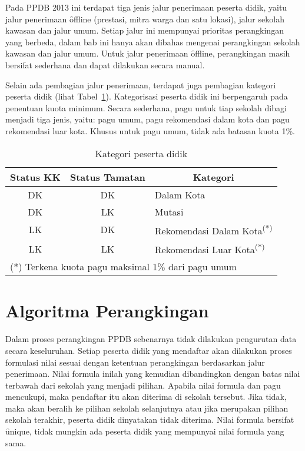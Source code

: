 Pada PPDB 2013 ini terdapat tiga jenis jalur penerimaan peserta didik, yaitu
jalur penerimaan \f{offline} (prestasi, mitra warga dan satu lokasi), jalur
sekolah kawasan dan jalur umum. Setiap jalur ini mempunyai prioritas
perangkingan yang berbeda, dalam bab ini hanya akan dibahas mengenai
perangkingan sekolah kawasan dan jalur umum. Untuk jalur penerimaan
\f{offline}, perangkingan masih bersifat sederhana dan dapat dilakukan secara
manual.

Selain ada pembagian jalur penerimaan, terdapat juga pembagian kategori peserta
didik (lihat Tabel~\ref{tab:kategori}). Kategorisasi peserta didik ini
berpengaruh pada penentuan kuota minimum.  Secara sederhana, pagu untuk tiap
sekolah dibagi menjadi tiga jenis, yaitu: pagu umum, pagu rekomendasi dalam
kota dan pagu rekomendasi luar kota. Khusus untuk pagu umum, tidak ada batasan
kuota 1\%.

\begin{table}
\centering 
\caption{Kategori peserta didik}
\label{tab:kategori}
\begin{tabular} {c c l}
  \hline
  Status KK & Status Tamatan & \multicolumn{1}{c}{Kategori} \\
  \hline
  \hline
  DK & DK & Dalam Kota \\
  DK & LK & Mutasi \\
  LK & DK & Rekomendasi Dalam Kota\textsuperscript{(*)} \\
  LK & LK & Rekomendasi Luar Kota\textsuperscript{(*)} \\
  \hline  
  \multicolumn{3}{l}{\footnotesize{(*) Terkena kuota pagu maksimal 1\% dari pagu umum}} \\
\end{tabular}
\end{table}


\section{Algoritma Perangkingan}
\label{sec:algoritma_perangkingan}

Dalam proses perangkingan PPDB sebenarnya tidak dilakukan pengurutan data
secara keseluruhan. Setiap peserta didik yang mendaftar akan dilakukan proses
formulasi nilai sesuai dengan ketentuan perangkingan berdasarkan jalur
penerimaan. Nilai formula inilah yang kemudian dibandingkan dengan batas nilai
terbawah dari sekolah yang menjadi pilihan. Apabila nilai formula dan pagu
mencukupi, maka pendaftar itu akan diterima di sekolah tersebut. Jika tidak,
maka akan beralih ke pilihan sekolah selanjutnya atau jika merupakan pilihan
sekolah terakhir, peserta didik dinyatakan tidak diterima. Nilai formula
bersifat \f{unique}, tidak mungkin ada peserta didik yang mempunyai nilai
formula yang sama.

